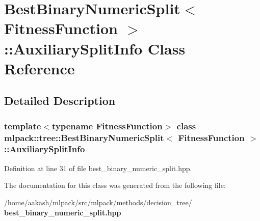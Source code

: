 \section{Best\+Binary\+Numeric\+Split$<$ Fitness\+Function $>$\+:\+:Auxiliary\+Split\+Info Class Reference}
\label{classmlpack_1_1tree_1_1BestBinaryNumericSplit_1_1AuxiliarySplitInfo}


\subsection{Detailed Description}
\subsubsection*{template$<$typename Fitness\+Function$>$\newline
class mlpack\+::tree\+::\+Best\+Binary\+Numeric\+Split$<$ Fitness\+Function $>$\+::\+Auxiliary\+Split\+Info}



Definition at line 31 of file best\+\_\+binary\+\_\+numeric\+\_\+split.\+hpp.



The documentation for this class was generated from the following file\+:\begin{DoxyCompactItemize}
\item 
/home/aakash/mlpack/src/mlpack/methods/decision\+\_\+tree/\textbf{ best\+\_\+binary\+\_\+numeric\+\_\+split.\+hpp}\end{DoxyCompactItemize}
